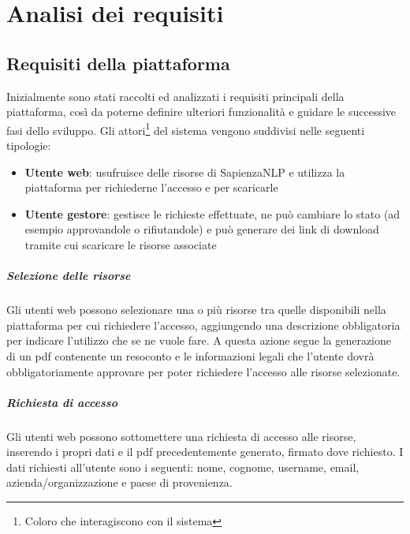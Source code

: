 
\chapter{Analisi dei requisiti}


\section{Requisiti della piattaforma}
Inizialmente sono stati raccolti ed analizzati i requisiti principali della
piattaforma, così da poterne definire ulteriori funzionalità e guidare le
successive fasi dello sviluppo.
Gli attori\footnote{Coloro che interagiscono con il sistema} del sistema
vengono suddivisi nelle seguenti tipologie:

\begin{itemize}
	\item \textbf{Utente web}: usufruisce delle risorse di SapienzaNLP e utilizza
	la piattaforma per richiederne l'accesso e per scaricarle
	\item \textbf{Utente gestore}: gestisce le richieste effettuate, ne
	può cambiare lo stato (ad esempio approvandole o rifiutandole) e può generare
	dei link di download tramite cui scaricare le risorse associate
\end{itemize}

\paragraph{Selezione delle risorse}
Gli utenti web possono selezionare una o più risorse tra quelle disponibili nella
piattaforma per cui richiedere l'accesso, aggiungendo una descrizione obbligatoria
per indicare l'utilizzo che se ne vuole fare. A questa azione segue la generazione
di un pdf contenente un resoconto e le informazioni legali che l'utente dovrà
obbligatoriamente approvare per poter richiedere l'accesso alle risorse selezionate.

\paragraph{Richiesta di accesso} \label{par:access-request}
Gli utenti web possono sottomettere una richiesta di accesso alle risorse, inserendo
i propri dati e il pdf precedentemente generato, firmato dove richiesto.
I dati richiesti all'utente sono i seguenti: nome, cognome, username, email,
azienda/organizzazione e paese di provenienza.

